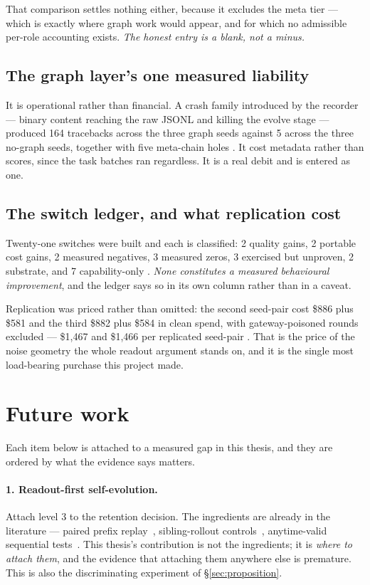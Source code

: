 That comparison settles nothing either, because it excludes the meta tier
--- which is exactly where graph work would appear, and for which no
admissible per-role accounting exists. \emph{The honest entry is a blank,
not a minus.}

\subsection*{The graph layer's one measured liability}

It is operational rather than financial. A crash family introduced by the
recorder --- binary content reaching the raw JSONL and killing the evolve
stage --- produced 164 tracebacks across the three graph seeds against 5
across the three no-graph seeds, together with five meta-chain holes . It
cost metadata rather than scores, since the task batches ran regardless.
It is a real debit and is entered as one.

\subsection*{The switch ledger, and what replication cost}

Twenty-one switches were built and each is classified: 2 quality gains, 2
portable cost gains, 2 measured negatives, 3 measured zeros, 3 exercised
but unproven, 2 substrate, and 7 capability-only . \emph{None
constitutes a measured behavioural improvement}, and the ledger says so in
its own column rather than in a caveat.

Replication was priced rather than omitted: the second seed-pair cost
\$886 plus \$581 and the third \$882 plus \$584 in clean spend, with
gateway-poisoned rounds excluded --- \$1{,}467 and \$1{,}466 per replicated
seed-pair . That is the price of the noise geometry the whole
readout argument stands on, and it is the single most load-bearing purchase
this project made.

\section{Future work}
\label{sec:future}

Each item below is attached to a measured gap in this thesis, and they are
ordered by what the evidence says matters.

\paragraph{1. Readout-first self-evolution.} Attach level 3 to the
retention decision. The ingredients are already in the literature ---
paired prefix replay~\cite{shepherd,car}, sibling-rollout
controls~\cite{craft}, anytime-valid sequential tests~\cite{pace}. This
thesis's contribution is not the ingredients; it is \emph{where to attach
them}, and the evidence that attaching them anywhere else is premature.
This is also the discriminating experiment of \S\ref{sec:proposition}.


